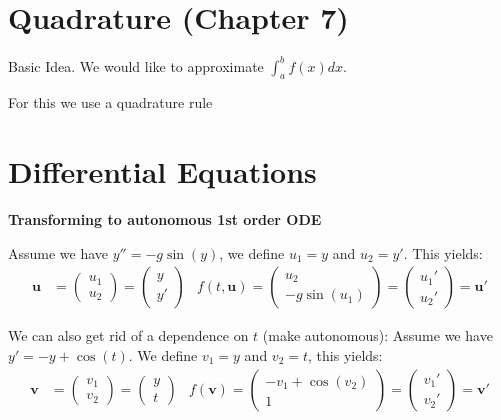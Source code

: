 \documentclass{sciposter}
\newcommand{\TODO}[1]{\todo[inline, color=red!40]{#1}}
\renewcommand{\vec}[1]{\mathbf{#1}}
\newcommand{\psection}[1]{\par \textbf{\large#1}}
\begin{document}
\begin{multicols}{2}
\begin{itemize}
\end{itemize}




\section{Quadrature (Chapter 7)}


Basic Idea. We would like to approximate $\int_{a}^{b} f(x) dx$. 

For this we use a quadrature rule \TODO{add stuff}


\section*{Differential Equations}

\psection{Transforming to autonomous 1st order ODE}

Assume we have $y'' = -g\sin(y)$, we define $u_1 = y$ and $u_2 = y'$. This yields:
\begin{align*}
	\vec{u} &= \begin{pmatrix}
	u_1 \\ u_2
	\end{pmatrix} = \begin{pmatrix}
	y \\ y'
	\end{pmatrix} & f(t,\vec{u}) = \begin{pmatrix}
	u_2 \\ -g\sin(u_1)
	\end{pmatrix} = \begin{pmatrix}
	u_1 '\\ u_2 '
	\end{pmatrix} = \vec{u}'
\end{align*}


We can also get rid of a dependence on $t$ (make autonomous): Assume we have $y' = -y + \cos(t)$. We define $v_1 = y$ and $v_2 = t$, this yields:
\begin{align*}
	\vec{v} &= \begin{pmatrix}
		v_1 \\ v_2
	\end{pmatrix} = \begin{pmatrix}
		y \\ t
	\end{pmatrix} & f(\vec{v}) = \begin{pmatrix}
		-v_1 + \cos(v_2) \\ 1
	\end{pmatrix} = \begin{pmatrix}
		v_1 '\\ v_2 '
	\end{pmatrix} = \vec{v}'
\end{align*}




\end{multicols}
\end{document}
